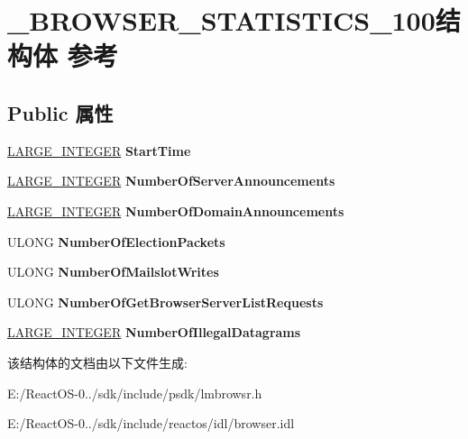 \hypertarget{struct___b_r_o_w_s_e_r___s_t_a_t_i_s_t_i_c_s__100}{}\section{\+\_\+\+B\+R\+O\+W\+S\+E\+R\+\_\+\+S\+T\+A\+T\+I\+S\+T\+I\+C\+S\+\_\+100结构体 参考}
\label{struct___b_r_o_w_s_e_r___s_t_a_t_i_s_t_i_c_s__100}
\subsection*{Public 属性}
\begin{DoxyCompactItemize}
\item 
\mbox{\label{struct___b_r_o_w_s_e_r___s_t_a_t_i_s_t_i_c_s__100_a395adb232547ba74e9d199ec8fdde099}} 
\hyperlink{union___l_a_r_g_e___i_n_t_e_g_e_r}{L\+A\+R\+G\+E\+\_\+\+I\+N\+T\+E\+G\+ER} {\bfseries Start\+Time}
\item 
\mbox{\label{struct___b_r_o_w_s_e_r___s_t_a_t_i_s_t_i_c_s__100_a62275ac977f4574d4832ee005a6046eb}} 
\hyperlink{union___l_a_r_g_e___i_n_t_e_g_e_r}{L\+A\+R\+G\+E\+\_\+\+I\+N\+T\+E\+G\+ER} {\bfseries Number\+Of\+Server\+Announcements}
\item 
\mbox{\label{struct___b_r_o_w_s_e_r___s_t_a_t_i_s_t_i_c_s__100_a49df3bfc2a5d3fa401d623424ac3e1d6}} 
\hyperlink{union___l_a_r_g_e___i_n_t_e_g_e_r}{L\+A\+R\+G\+E\+\_\+\+I\+N\+T\+E\+G\+ER} {\bfseries Number\+Of\+Domain\+Announcements}
\item 
\mbox{\label{struct___b_r_o_w_s_e_r___s_t_a_t_i_s_t_i_c_s__100_a624e8323bc8f9af322b56cc2a39228dd}} 
U\+L\+O\+NG {\bfseries Number\+Of\+Election\+Packets}
\item 
\mbox{\label{struct___b_r_o_w_s_e_r___s_t_a_t_i_s_t_i_c_s__100_aaef3a89a546664153ed988d1c87ffcd7}} 
U\+L\+O\+NG {\bfseries Number\+Of\+Mailslot\+Writes}
\item 
\mbox{\label{struct___b_r_o_w_s_e_r___s_t_a_t_i_s_t_i_c_s__100_a56dc0488693c0c0f10a606943aeab8a7}} 
U\+L\+O\+NG {\bfseries Number\+Of\+Get\+Browser\+Server\+List\+Requests}
\item 
\mbox{\label{struct___b_r_o_w_s_e_r___s_t_a_t_i_s_t_i_c_s__100_afe599ae86ae4635995bf2e7dbcf9c6ca}} 
\hyperlink{union___l_a_r_g_e___i_n_t_e_g_e_r}{L\+A\+R\+G\+E\+\_\+\+I\+N\+T\+E\+G\+ER} {\bfseries Number\+Of\+Illegal\+Datagrams}
\end{DoxyCompactItemize}


该结构体的文档由以下文件生成\+:\begin{DoxyCompactItemize}
\item 
E\+:/\+React\+O\+S-\/0../sdk/include/psdk/lmbrowsr.\+h\item 
E\+:/\+React\+O\+S-\/0../sdk/include/reactos/idl/browser.\+idl\end{DoxyCompactItemize}
